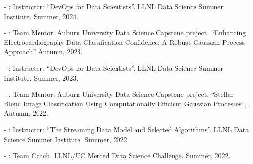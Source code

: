 \begin{innerlist}
  \item[-]: Instructor: ``DevOps for Data Scientists''.
  LLNL Data Science Summer Institute.
  Summer, 2024.

  \item[-]: Team Mentor.
  Auburn University Data Science Capstone project.
  ``Enhancing Electrocardiography Data Classification Confidence: A Robust Gaussian Process Approach''
  Autumn, 2023.

  \item[-]: Instructor: ``DevOps for Data Scientists''.
  LLNL Data Science Summer Institute.
  Summer, 2023.

  \item[-]: Team Mentor.
  Auburn University Data Science Capstone project.
  ``Stellar Blend Image Classification Using Computationally Efficient Gaussian Processes'',
  Autumn, 2022.

  \item[-]: Instructor: ``The Streaming Data Model and Selected Algorithms''.
  LLNL Data Science Summer Institute.
  Summer, 2022.

  \item[-]: Team Coach.
  LLNL/UC Merced Data Science Challenge.
  Summer, 2022.

\end{innerlist}

